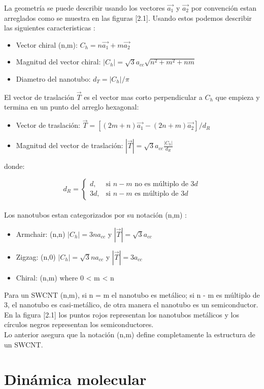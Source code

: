 La geometría se puede describir usando los vectores $\vec{a_1}$ y $\vec{a_2}$ por convención estan arreglados como se muestra en las figuras [2.1]. Usando estos podemos describir las siguientes caracteristicas \cite{Melendez2016}:\\

\begin{itemize}
    \item Vector chiral (n,m): $C_h = n\vec{a_1} + m\vec{a_2}$
    \item Magnitud del vector chiral: $\left|C_h\right| = \sqrt{3}a_{cc}\sqrt{n^2+m^2+nm}$
    \item Diametro del nanotubo: $d_T = \left|C_h\right|/\pi$
\end{itemize}

El vector de traslación $\vec{T}$ es el vector mas corto perpendicular a $C_h$ que empieza y termina en un punto del arreglo hexagonal:

\begin{itemize}
    \item Vector de traslación: $\vec{T} = \left[\left(2m+n\right)\vec{a_1} - \left(2n+m\right)\vec{a_2}\right]/d_R$
    \item Magnitud del vector de traslación: $\left|\vec{T}\right|=\sqrt{3}a_{cc}\frac{\left|C_h\right|}{d_R}$
\end{itemize}

donde:

\begin{equation}\label{dR}
    d_R =
    \begin{cases} 
    d,& \text{si } n-m \text{ no es múltiplo de } 3d\\
    3d,& \text{si } n-m \text{ es múltiplo de } 3d
    \end{cases}
\end{equation}\\

Los nanotubos estan categorizados por su notación (n,m) \cite{Melendez2016}:

\begin{itemize}
    \item Armchair: (n,n) $\left|C_h\right|=3na_{cc}$ y $\left|\vec{T}\right|=\sqrt{3}a_{cc}$
    \item Zigzag: (n,0) $\left|C_h\right|=\sqrt{3}na_{cc}$ y $\left|\vec{T}\right|=3a_{cc}$
    \item Chiral: (n,m) where 0 < m < n
\end{itemize}

Para un SWCNT (n,m), si n = m el nanotubo es metálico; si n - m es múltiplo de 3, el nanotubo es casi-metálico, de otra manera el nanotubo es un semiconductor. En la figura [2.1] los puntos rojos representan los nanotubos metálicos y los círculos negros representan los semiconductores.\\

Lo anterior asegura que la notación (n,m) define completamente la estructura de un SWCNT.

\begingroup
\let\clearpage\relax
\chapter{Dinámica molecular}
\endgroup
